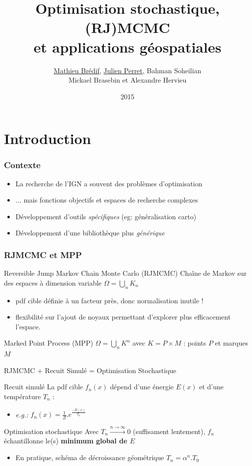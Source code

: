 \documentclass{beamer}
\title{Optimisation stochastique, (RJ)MCMC\\ et applications g\'eospatiales}
\author{\underline{Mathieu Brédif}, \underline{Julien Perret}, Bahman Soheilian\\Mickael Brasebin et Alexandre Hervieu}
\institute{IGN}
\date{2015}
\begin{document}
\frame{\titlepage}
 
 
\section{Introduction}

\begin{frame}
\frametitle{Contexte}
\begin{itemize}
\item La recherche de l'IGN a souvent des probl\`emes d'optimisation
\item ... mais fonctions objectifs et espaces de recherche complexes
\item D\'eveloppement d'outils \emph{sp\'ecifiques} (eg: g\'en\'eralisation carto)
\item D\'eveloppement d'une biblioth\`eque plus \emph{g\'en\'erique}
\end{itemize}
\end{frame}


\begin{frame}
\frametitle{RJMCMC et MPP}
\begin{block}{Reversible Jump Markov Chain Monte Carlo (RJMCMC)}
Chaîne de Markov sur des espaces à dimension variable $\Omega=\bigcup_n K_n$
\begin{itemize}
\item pdf cible définie à un facteur près, donc normalisation inutile !
\item flexibilité sur l'ajout de noyaux permettant d'explorer plus efficacement l'espace.
\end{itemize}
\end{block}

\begin{block}{Marked Point Process (MPP)}
$\Omega=\bigcup_n K^n$ avec $K=P\times M$ : points $P$ et marques $M$
\end{block}
\end{frame}



\begin{frame}{RJMCMC + Recuit Simulé = Optimisation Stochastique}

\begin{block}{Recuit simulé}
La pdf cible $f_n(x)$ dépend d'une énergie $E(x)$ et d'une température $T_n$ :
\begin{itemize}
\item \textit{e.g.:} $f_n(x) = \frac{1}{Z}.e^\frac{-E(x)}{T_n}$
\end{itemize}
\end{block}

\begin{block}{Optimisation stochastique }
Avec $T_n\overset{n\rightarrow\infty}{\longrightarrow} 0$ (suffisament lentement), $f_n$ échantillonne le(s) \textbf{minimum global de $E$} 
\begin{itemize}
\item En pratique, schéma de décroissance géométrique $T_n=\alpha^n.T_0$
\end{itemize}
\end{block}

\end{frame}
\end{document}
